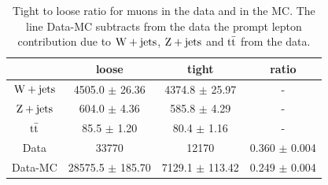 \begin{table}[htb]
\begin{center}
\begin{tabular}{*4c}
    \toprule
 & 	 loose & 	 tight & 	 ratio \\
 \midrule
$\mathrm{W} + \text{jets}$ & 	4505.0 $\pm$ 26.36 & 	4374.8 $\pm$ 25.97 & 	     -     \\
$\mathrm{Z} + \text{jets}$ & 	604.0 $\pm$ 4.36 & 	585.8 $\pm$ 4.29 & 	     -     \\
$\mathrm{t}\bar{\mathrm{t}}$ & 	85.5 $\pm$ 1.20 & 	80.4 $\pm$ 1.16 & 	     -     \\
\bottomrule
Data & 	33770 & 	12170 & 	0.360 $\pm$ 0.004 \\
Data-MC &	28575.5 $\pm$ 185.70 & 	7129.1 $\pm$ 113.42 & 	0.249 $\pm$ 0.004 \\
\bottomrule
\end{tabular}
\caption{Tight to loose ratio for muons in the data and in the MC. The line
    Data-MC subtracts from the data the prompt lepton contribution due to
    $\mathrm{W} + \text{jets}$, 
$\mathrm{Z} + \text{jets}$ and $\mathrm{t}\bar{\mathrm{t}}$ from the data.}
\label{tab:FRwMCMu}
\end{center}
\end{table}

